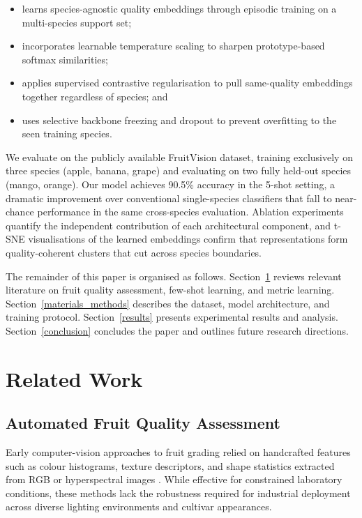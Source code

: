 \documentclass[preprint,12pt,authoryear]{elsarticle}
\begin{document}
\begin{itemize}
  \item learns species-agnostic quality embeddings through episodic training on
        a multi-species support set;
  \item incorporates learnable temperature scaling \citep{guo2017calibration} to
        sharpen prototype-based softmax similarities;
  \item applies supervised contrastive regularisation \citep{khosla2020supervised}
        to pull same-quality embeddings together regardless of species; and
  \item uses selective backbone freezing and dropout to prevent overfitting to
        the seen training species.
\end{itemize}

We evaluate on the publicly available FruitVision dataset, training exclusively
on three species (apple, banana, grape) and evaluating on two fully held-out
species (mango, orange). Our model achieves 90.5\% accuracy in the 5-shot
setting, a dramatic improvement over conventional single-species classifiers that
fall to near-chance performance in the same cross-species evaluation. Ablation
experiments quantify the independent contribution of each architectural component,
and t-SNE visualisations of the learned embeddings confirm that representations
form quality-coherent clusters that cut across species boundaries.

The remainder of this paper is organised as follows.
Section~\ref{related_work} reviews relevant literature on fruit quality
assessment, few-shot learning, and metric learning.
Section~\ref{materials_methods} describes the dataset, model architecture,
and training protocol.
Section~\ref{results} presents experimental results and analysis.
Section~\ref{conclusion} concludes the paper and outlines future research
directions.

\section{Related Work}
\label{related_work}

\subsection{Automated Fruit Quality Assessment}

Early computer-vision approaches to fruit grading relied on handcrafted features
such as colour histograms, texture descriptors, and shape statistics extracted from
RGB or hyperspectral images \citep{brosnan2004improving, blasco2007recognition}.
While effective for constrained laboratory conditions, these methods lack the
robustness required for industrial deployment across diverse lighting environments
and cultivar appearances.
\end{document}
